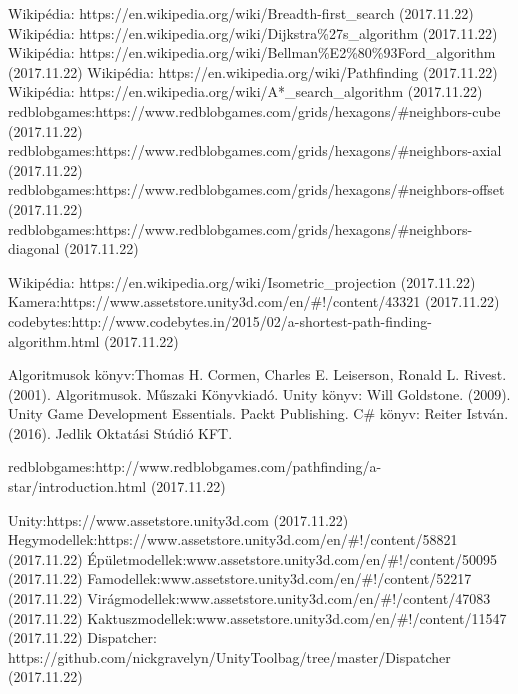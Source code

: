 \begin{thebibliography}{x}
 Wikipédia: https://en.wikipedia.org/wiki/Breadth-first\_search (2017.11.22)
 Wikipédia: https://en.wikipedia.org/wiki/Dijkstra\%27s\_algorithm (2017.11.22)
 Wikipédia: https://en.wikipedia.org/wiki/Bellman\%E2\%80\%93Ford\_algorithm (2017.11.22)
 Wikipédia: https://en.wikipedia.org/wiki/Pathfinding (2017.11.22)
 Wikipédia: https://en.wikipedia.org/wiki/A*\_search\_algorithm (2017.11.22)
 redblobgames:\;https://www.redblobgames.com/grids/hexagons/\#neighbors-cube (2017.11.22)
 redblobgames:\;https://www.redblobgames.com/grids/hexagons/\#neighbors-axial (2017.11.22)
 redblobgames:\;https://www.redblobgames.com/grids/hexagons/\#neighbors-offset (2017.11.22)
 redblobgames:\;https://www.redblobgames.com/grids/hexagons/\#neighbors-diagonal (2017.11.22)

 Wikipédia: https://en.wikipedia.org/wiki/Isometric\_projection (2017.11.22)
 Kamera:\;https://www.assetstore.unity3d.com/en/\#!/content/43321 (2017.11.22)
 codebytes:\;http://www.codebytes.in/2015/02/a-shortest-path-finding-algorithm.html (2017.11.22)

 Algoritmusok könyv:\;Thomas H. Cormen, Charles E. Leiserson, Ronald L. Rivest. (2001). Algoritmusok. Műszaki Könyvkiadó.
 Unity könyv: Will Goldstone. (2009). Unity Game Development Essentials. Packt Publishing.
 C\# könyv: Reiter István. (2016). Jedlik Oktatási Stúdió KFT.

 redblobgames:\;http://www.redblobgames.com/pathfinding/a-star/introduction.html (2017.11.22)

 Unity:\;https://www.assetstore.unity3d.com (2017.11.22)
 Hegy\;modellek:\;https://www.assetstore.unity3d.com/en/\#!/content/58821 (2017.11.22)
 Épület\;modellek:\;www.assetstore.unity3d.com/en/\#!/content/50095 (2017.11.22)
 Fa\;modellek:\;www.assetstore.unity3d.com/en/\#!/content/52217 (2017.11.22)
 Virág\;modellek:\;www.assetstore.unity3d.com/en/\#!/content/47083 (2017.11.22)
 Kaktusz\;modellek:\;www.assetstore.unity3d.com/en/\#!/content/11547 (2017.11.22)
 Dispatcher:\; \newline https://github.com/nickgravelyn/UnityToolbag/tree/master/Dispatcher (2017.11.22)









\end{thebibliography}
